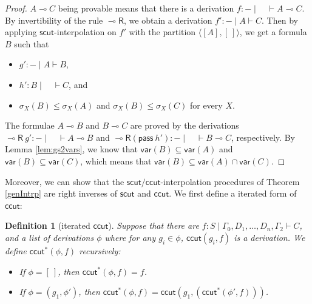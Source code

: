 \documentclass[sn-mathphys-num]{sn-jnl}%
\newcommand{\GG}{\Gamma}
\newcommand{\vd}{\vdash}
\newcommand{\pass}{\mathsf{pass}}
\newcommand{\lolli}{\multimap}
\newcommand{\lright}{{\lolli}\mathsf{R}}
\newcommand{\sls}{\slash}
\newcommand{\mf}[1]{\mathsf{#1}}
\newcommand{\gs}[1]{\sigma_{X} (#1)}
\newcommand{\vars}[1]{\mf{var} (#1)}
\theoremstyle{thmstyleone}%
\theoremstyle{thmstyletwo}%
\theoremstyle{thmstylethree}%
\newtheorem{definition}[theorem]{Definition}%
\begin{document}
\begin{proof}
$A \lolli C$ being provable means that there is a derivation $f : {-} \mid \quad \vd A \lolli C$. 
By invertibility of the rule $\lright$, we obtain a derivation $f' : {-} \mid A \vd C$.
Then by applying $\mf{scut}$-interpolation on $f'$ with the partition $\langle [A ], [\ ]\rangle$, we get a formula $B$ such that 
\begin{itemize}
  \item[--] $g': {-} \mid A \vd B$,
  \item[--] $h': B \mid \quad \vd C$, and 
  \item[--] $\gs{B} \leq \gs{A} $ and $ \gs{B} \leq \gs{C}$ for every $X$.
\end{itemize}
The formulae $A \lolli B$ and $B \lolli C$ are proved by the derivations $\lright \ g' : {-} \mid \quad \vd A \lolli B$ and $\lright (\pass \ h') : {-} \mid \quad \vd B \lolli C$, respectively.
By Lemma \ref{lem:gs2vars}, we know that $\vars{B} \subseteq \vars{A}$ and $\vars{B} \subseteq \vars{C}$, which means that $\vars{B} \subseteq \vars{A} \cap \vars{C}$.
\end{proof}
Moreover, we can show that the $\mf{scut}\sls \mf{ccut}$-interpolation procedures of Theorem \ref{genIntrp} are right inverses of $\mf{scut}$ and $\mf{ccut}$.
We first define a iterated form of $\mf{ccut}$:
\begin{definition}[iterated $\mf{ccut}$]
  Suppose that there are $f : S \mid \GG_0 , D_1 , \dots, D_n , \GG_2 \vd C$, and a list of derivations $\phi$ where for any $g_i \in \phi$, $\mf{ccut}(g_i , f)$ is a derivation. 
  We define $\mf{ccut}^* (\phi , f)$ recursively:
  \begin{itemize}
    \item[--] If $\phi = [\ ]$, then $\mf{ccut}^* (\phi , f) = f$.
    \item[--] If $\phi = (g_1 , \phi')$, then $\mf{ccut}^* (\phi , f) = \mf{ccut} (g_1 , (\mf{ccut}^* (\phi' , f)))$.
  \end{itemize}
\end{definition}
\end{document}
